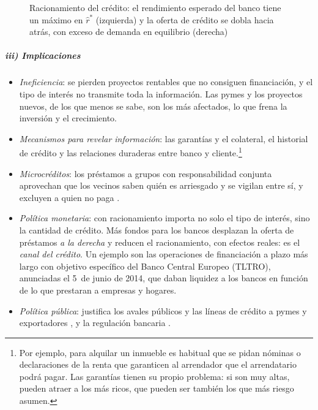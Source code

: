\documentclass[11pt]{article}
\begin{document}
\begin{figure}[H]
\centering
\caption{Racionamiento del crédito: el rendimiento esperado del banco tiene un máximo en $\hat r^*$ (izquierda) y la oferta de crédito se dobla hacia atrás, con exceso de demanda en equilibrio (derecha)}\label{fig:stiglitz-weiss}
\end{figure}

\subparagraph{iii) Implicaciones}

\begin{itemize}
\item \emph{Ineficiencia}: se pierden proyectos rentables que no consiguen financiación, y el tipo de interés no transmite toda la información. Las pymes y los proyectos nuevos, de los que menos se sabe, son los más afectados, lo que frena la inversión y el crecimiento.
\item \emph{Mecanismos para revelar información}: las garantías y el colateral, el historial de crédito y las relaciones duraderas entre banco y cliente.\footnote{Por ejemplo, para alquilar un inmueble es habitual que se pidan nóminas o declaraciones de la renta que garanticen al arrendador que el arrendatario podrá pagar. Las garantías tienen su propio problema: si son muy altas, pueden atraer a los más ricos, que pueden ser también los que más riesgo asumen\nocite{StiglitzWeiss1981Credit}.}
\item \emph{Microcréditos}: los préstamos a grupos con responsabilidad conjunta aprovechan que los vecinos saben quién es arriesgado y se vigilan entre sí, y excluyen a quien no paga\nocite{Stiglitz1990Peer,Ghatak1999Group} .
\item \emph{Política monetaria}: con racionamiento importa no solo el tipo de interés, sino la cantidad de crédito. Más fondos para los bancos desplazan la oferta de préstamos \emph{a la derecha} y reducen el racionamiento, con efectos reales: es el \emph{canal del crédito}. Un ejemplo son las operaciones de financiación a plazo más largo con objetivo específico del Banco Central Europeo (TLTRO), anunciadas el 5~de junio de 2014, que daban liquidez a los bancos en función de lo que prestaran a empresas y hogares\nocite{BCE2014TLTRO}.
\item \emph{Política pública}: justifica los avales públicos y las líneas de crédito a pymes y exportadores , y la regulación bancaria .
\end{itemize}
\end{document}
